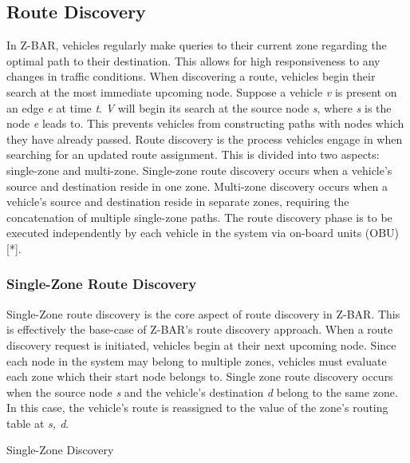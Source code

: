 \documentclass[conference]{IEEEtran}
\begin{document}
\subsection{Route Discovery}

In Z-BAR, vehicles regularly make queries to their current zone regarding the optimal path to their destination. This allows for high responsiveness to any changes in traffic conditions. When discovering a route, vehicles begin their search at the most immediate upcoming node. Suppose a vehicle \textit{v} is present on an edge \textit{e} at time \textit{t}. \textit{V} will begin its search at the source node \textit{s}, where \textit{s} is the node \textit{e} leads to. This prevents vehicles from constructing paths with nodes which they have already passed. Route discovery is the process vehicles engage in when searching for an updated route assignment. This is divided into two aspects: single-zone and multi-zone. Single-zone route discovery occurs when a vehicle's source and destination reside in one zone. Multi-zone discovery occurs when a vehicle's source and destination reside in separate zones, requiring the concatenation of multiple single-zone paths. The route discovery phase is to be executed independently by each vehicle in the system via on-board units (OBU) [*].

\subsubsection{Single-Zone Route Discovery}

Single-Zone route discovery is the core aspect of route discovery in Z-BAR. This is effectively the base-case of Z-BAR's route discovery approach. When a route discovery request is initiated, vehicles begin at their next upcoming node. Since each node in the system may belong to multiple zones, vehicles must evaluate each zone which their start node belongs to. Single zone route discovery occurs when the source node \textit{s} and the vehicle's destination \textit{d} belong to the same zone. In this case, the vehicle's route is reassigned to the value of the zone's routing table at \textit{s, d}.

\begin{algorithm}[H]
  \caption{Single-Zone Discovery}
  \label{route_discovery_single_zone}
  \begin{algorithmic}[1]
  \EndProcedure
  \end{algorithmic}
\end{algorithm}
\end{document}
